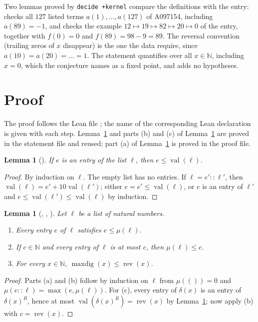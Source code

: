 \documentclass[11pt]{amsart}
\theoremstyle{plain}
\newtheorem{lemma}[theorem]{Lemma}
\theoremstyle{definition}
\newcommand{\N}{\mathbb{N}}
\newcommand{\rev}{\operatorname{rev}}
\newcommand{\maxdig}{\operatorname{maxdig}}
\newcommand{\val}{\operatorname{val}}
\begin{document}
Two lemmas proved by \texttt{decide +kernel} compare the definitions with the entry:  checks all $127$ listed terms $a(1),\dots,a(127)$ of A097154, including $a(89)=-1$, and  checks the example $12\mapsto19\mapsto82\mapsto20\mapsto0$ of the entry, together with $f(0)=0$ and $f(89)=98-9=89$.
The reversal convention (trailing zeros of $x$ disappear) is the one the data require, since $a(10)=a(20)=\dots=1$.
The statement quantifies over all $x\in\N$, including $x=0$, which the conjecture names as a fixed point, and adds no hypotheses.

\section{Proof}\label{sec:proof}

The proof follows the Lean file ; the name of the corresponding Lean declaration is given with each step. Lemma~\ref{lem:mem} and parts (b) and (c) of Lemma~\ref{lem:max} are proved in the statement file and reused; part (a) of Lemma~\ref{lem:max} is proved in the proof file.

\begin{lemma}[]\label{lem:mem}
If $e$ is an entry of the list $\ell$, then $e\le\val(\ell)$.
\end{lemma}

\begin{proof}
By induction on $\ell$. The empty list has no entries. If $\ell=e'::\ell'$, then $\val(\ell)=e'+10\val(\ell')$; either $e=e'\le\val(\ell)$, or $e$ is an entry of $\ell'$ and $e\le\val(\ell')\le\val(\ell)$ by induction.
\end{proof}

\begin{lemma}[, , ]\label{lem:max}
Let $\ell$ be a list of natural numbers.
\begin{enumerate}
\item[(a)] Every entry $e$ of $\ell$ satisfies $e\le\mu(\ell)$.
\item[(b)] If $c\in\N$ and every entry of $\ell$ is at most $c$, then $\mu(\ell)\le c$.
\item[(c)] For every $x\in\N$, $\maxdig(x)\le\rev(x)$.
\end{enumerate}
\end{lemma}

\begin{proof}
Parts (a) and (b) follow by induction on $\ell$ from $\mu(())=0$ and $\mu(e::\ell)=\max(e,\mu(\ell))$. For (c), every entry of $\delta(x)$ is an entry of $\delta(x)^R$, hence at most $\val(\delta(x)^R)=\rev(x)$ by Lemma~\ref{lem:mem}; now apply (b) with $c=\rev(x)$.
\end{proof}
\end{document}
